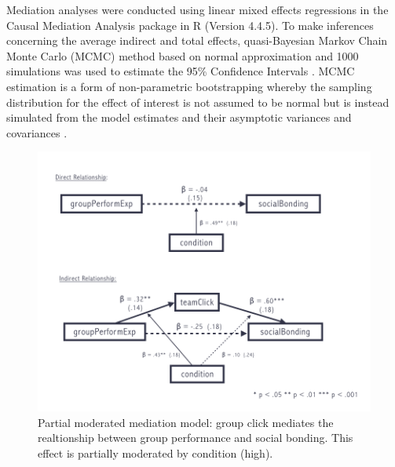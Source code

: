 

Mediation analyses were conducted using linear mixed effects regressions in the Causal Mediation Analysis package in R (Version 4.4.5).  To make inferences concerning the average indirect and total effects, quasi-Bayesian Markov Chain Monte Carlo (MCMC) method based on normal approximation and 1000 simulations was used to estimate the 95\% Confidence Intervals \citep{Tofighi2016a,Imai2010}. MCMC estimation is a form of non-parametric bootstrapping whereby the sampling distribution for the effect of interest is not assumed to be normal but is instead simulated from the model estimates and their asymptotic variances and covariances \cite{Preacher2008}.

\begin{figure}
  \centering
  \includegraphics[width=0.9\linewidth,keepaspectratio] {images/postExperimentModMedFigure}
  \caption{Partial moderated mediation model: group click mediates the realtionship between group performance and social bonding.  This effect is partially moderated by condition (high).}
  \label{fig:postExperimentModMedFigure}
\end{figure}

